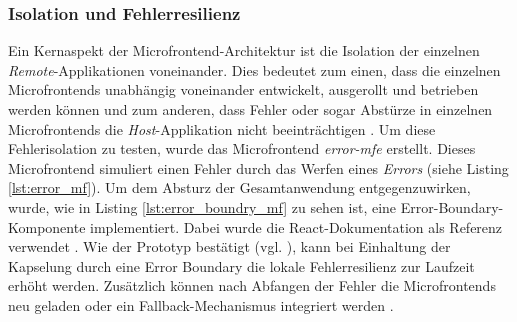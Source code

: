 \subsubsection{Isolation und Fehlerresilienz}  \label{sec:isolation_mf}
Ein Kernaspekt der Microfrontend-Architektur ist die Isolation der einzelnen \textit{Remote}-Applikationen voneinander. Dies bedeutet zum einen, dass die einzelnen Microfrontends unabhängig voneinander entwickelt, ausgerollt und betrieben werden können und zum anderen, dass Fehler oder sogar Abstürze in einzelnen Microfrontends die \textit{Host}-Applikation nicht beeinträchtigen \cite{sandeepa}. Um diese Fehlerisolation zu testen, wurde das Microfrontend \textit{error-mfe} erstellt. Dieses Microfrontend simuliert einen Fehler durch das Werfen eines \textit{Errors} (siehe Listing \ref{lst:error_mf}). Um dem Absturz der Gesamtanwendung entgegenzuwirken, wurde, wie in Listing \ref{lst:error_boundry_mf} zu sehen ist, eine Error-Boundary-Komponente implementiert. Dabei wurde die React-Dokumentation als Referenz verwendet \cite{react_docs_error_boundaries}.
Wie der Prototyp bestätigt (vgl. \cite[\texttt{building\_management/apps/error\_mf/App.tsx}]{eigener_code_usb}), kann bei Einhaltung der Kapselung durch eine Error Boundary die lokale Fehlerresilienz zur Laufzeit erhöht werden. Zusätzlich können nach Abfangen der Fehler die Microfrontends neu geladen oder ein Fallback-Mechanismus integriert werden \cite{sandeepa}.

